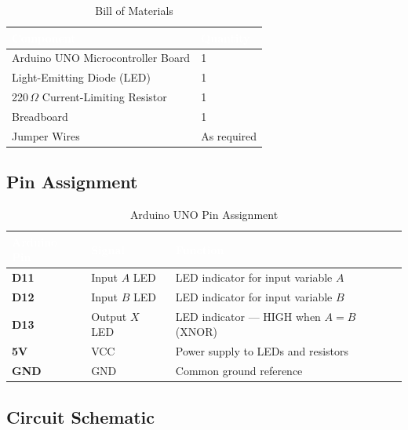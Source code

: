 \documentclass[12pt,a4paper]{article}
\begin{document}
\begin{table}[H]
\centering
\caption{Bill of Materials}
\renewcommand{\arraystretch}{1.4}
\begin{tabular}{L{6cm} C{3cm}}
\toprule
{}
\textcolor{white}{\textbf{Component}} &
\textcolor{white}{\textbf{Quantity}} \\
\midrule
Arduino UNO Microcontroller Board & 1 \\
Light-Emitting Diode (LED)         & 1 \\
220\,$\Omega$ Current-Limiting Resistor & 1 \\
Breadboard                         & 1 \\
Jumper Wires                       & As required \\
\bottomrule
\end{tabular}
\end{table}

\subsection{Pin Assignment}

\begin{table}[H]
\centering
\caption{Arduino UNO Pin Assignment}
\renewcommand{\arraystretch}{1.4}
\begin{tabular}{C{2.5cm} C{2.5cm} L{6.5cm}}
\toprule
{}
\textcolor{white}{\textbf{Arduino Pin}} &
\textcolor{white}{\textbf{Signal}} &
\textcolor{white}{\textbf{Function}} \\
\midrule
\textcolor{accentblue}{\textbf{D11}} & Input $A$ LED  & LED indicator for input variable $A$ \\
\textcolor{accentblue}{\textbf{D12}} & Input $B$ LED  & LED indicator for input variable $B$ \\
\textcolor{accentblue}{\textbf{D13}} & Output $X$ LED & LED indicator --- HIGH when $A = B$ (XNOR) \\
\textcolor{accentblue}{\textbf{5V}}  & VCC            & Power supply to LEDs and resistors \\
\textcolor{accentblue}{\textbf{GND}} & GND            & Common ground reference \\
\bottomrule
\end{tabular}
\end{table}

\subsection{Circuit Schematic}
\end{document}
